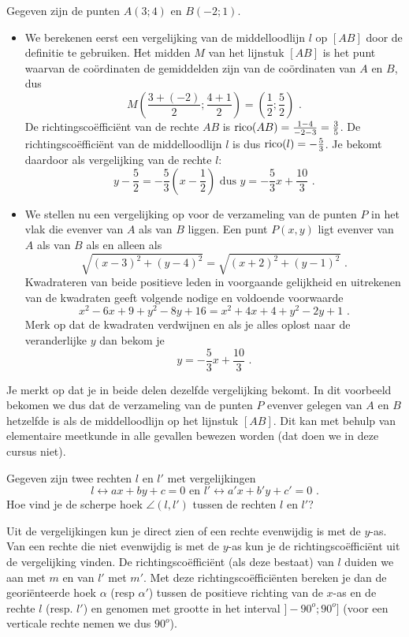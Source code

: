 \begin{voorbeeld}
Gegeven zijn de punten $A(3;4)$ en $B(-2;1)$.
\begin{itemize}
\item We berekenen eerst een vergelijking van de middelloodlijn $l$ op $[AB]$ door de definitie te gebruiken.
Het midden $M$ van het lijnstuk $[AB]$ is het punt waarvan de co\"ordinaten de gemiddelden zijn van de co\"ordinaten van $A$ en $B$, dus 
\[
M(\frac{3+(-2)}{2};\frac{4+1}{2})=(\frac{1}{2};\frac{5}{2}) \text { .}
\]
De richtingsco\"effici\"ent van de rechte $AB$ is $\operatorname{rico} (AB)=\frac {1-4}{-2-3}=\frac{3}{5}$.
De richtingsco\"effici\"ent van de middelloodlijn $l$ is dus $\operatorname{rico} (l)=-\frac{5}{3}$.
Je bekomt daardoor als vergelijking van de rechte $l$:
\[
y-\frac{5}{2}=-\frac{5}{3}(x-\frac{1}{2}) \text { dus } y=-\frac{5}{3}x+\frac{10}{3} \text { .}
\]
\item We stellen nu een vergelijking op voor de verzameling van de punten $P$ in het vlak die evenver van $A$ als van $B$ liggen.
Een punt $P(x,y)$ ligt evenver van $A$ als van $B$ als en alleen als
\[
\sqrt{(x-3)^2+(y-4)^2}=\sqrt{(x+2)^2+(y-1)^2} \text { .}
\]
Kwadrateren van beide positieve leden in voorgaande gelijkheid en uitrekenen van de kwadraten geeft volgende nodige en voldoende voorwaarde
\[
x^2-6x+9+y^2-8y+16=x^2+4x+4+y^2-2y+1 \text { .}
\]
Merk op dat de kwadraten verdwijnen en als je alles oplost naar de veranderlijke $y$ dan bekom je
\[
y=-\frac{5}{3}x+\frac{10}{3} \text { .}
\]
\end{itemize}
Je merkt op dat je in beide delen dezelfde vergelijking bekomt.
In dit voorbeeld bekomen we dus dat de verzameling van de punten $P$ evenver gelegen van $A$ en $B$ hetzelfde is als de middelloodlijn op het lijnstuk $[AB]$.
Dit kan met behulp van elementaire meetkunde in alle gevallen bewezen worden (dat doen we in deze cursus niet).\\

\end{voorbeeld}

Gegeven zijn twee rechten $l$ en $l'$ met vergelijkingen
\[
l \leftrightarrow ax+by+c=0 \text { en } l' \leftrightarrow a'x+b'y+c'=0 \text { .}
\]
Hoe vind je de scherpe hoek $\angle (l,l')$ tussen de rechten $l$ en $l'$?

Uit de vergelijkingen kun je direct zien of een rechte evenwijdig is met de $y$-as.
Van een rechte die niet evenwijdig is met de $y$-as kun je de richtingsco\"effici\"ent uit de vergelijking vinden.
De richtingsco\"effici\"ent (als deze bestaat) van $l$ duiden we aan met $m$ en van $l'$ met $m'$.
Met deze richtingsco\"effici\"enten bereken je dan de geori\"enteerde hoek $\alpha$ (resp $\alpha '$) tussen de positieve richting van de $x$-as en de rechte $l$ (resp. $l'$) en genomen met grootte in het interval $]-90^o;90^o]$ (voor een verticale rechte nemen we dus $90^o$).

